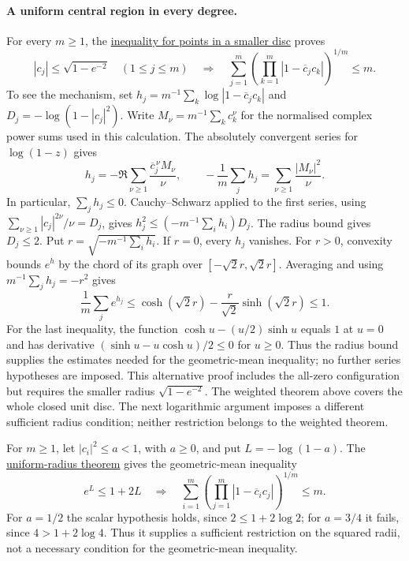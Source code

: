 \documentclass[11pt]{article}
\begin{document}
\paragraph{A uniform central region in every degree.}
For every $m\ge1$, the
\href{https://github.com/wcook04/plectis-erdos/blob/3be82b1a7340284aea72e9a5c8493cb020843921/ErdosProblems/Erdos1041/FreePointCentralCompletion.lean#L39}{inequality for points in a smaller disc}
proves
\[
 |c_j|\le\sqrt{1-e^{-2}}\quad(1\le j\le m)
 \quad\Longrightarrow\quad
 \sum_{j=1}^m\left(\prod_{k=1}^m|1-\overline c_jc_k|\right)^{1/m}\le m.
\]
To see the mechanism, set
$h_j=m^{-1}\sum_k\log|1-\overline c_jc_k|$ and
$D_j=-\log(1-|c_j|^2)$. Write
$M_\nu=m^{-1}\sum_k c_k^\nu$ for the normalised complex power sums used in this
calculation. The absolutely convergent series for $\log(1-z)$ gives
\[
 h_j=-\Re\sum_{\nu\ge1}\frac{\overline c_j^{\,\nu}M_\nu}{\nu},
 \qquad
 -\frac1m\sum_jh_j=\sum_{\nu\ge1}\frac{|M_\nu|^2}{\nu}.
\]
In particular, $\sum_jh_j\le0$. Cauchy--Schwarz applied to the first
series, using
$\sum_{\nu\ge1}|c_j|^{2\nu}/\nu=D_j$, gives
$h_j^2\le(-m^{-1}\sum_i h_i)D_j$. The radius bound gives $D_j\le2$.
Put $r=\sqrt{-m^{-1}\sum_i h_i}$. If $r=0$, every $h_j$ vanishes.
For $r>0$, convexity bounds $e^h$ by the chord of its graph over
$[-\sqrt2r,\sqrt2r]$. Averaging and using $m^{-1}\sum_jh_j=-r^2$ gives
\[
 \frac1m\sum_j e^{h_j}
 \le\cosh(\sqrt2r)-\frac r{\sqrt2}\sinh(\sqrt2r)\le1.
\]
For the last inequality, the function $\cosh u-(u/2)\sinh u$ equals
$1$ at $u=0$ and has derivative $(\sinh u-u\cosh u)/2\le0$ for
$u\ge0$. Thus the radius bound supplies the estimates needed for the
geometric-mean inequality; no further series hypotheses are imposed.
This alternative proof includes the all-zero configuration but requires
the smaller radius $\sqrt{1-e^{-2}}$. The weighted theorem above covers
the whole closed unit disc. The next logarithmic argument imposes a
different sufficient radius condition; neither restriction belongs to
the weighted theorem.

For $m\ge1$, let $|c_i|^2\le a<1$, with $a\ge0$, and put
$L=-\log(1-a)$. The
\href{https://github.com/wcook04/plectis-erdos/blob/457e0c74b2666f7fb2d825c967e49e439a600b23/ErdosProblems/Erdos1041/FreePointUniformRadius.lean#L84}{uniform-radius theorem}
gives the geometric-mean inequality
\[
 e^L\le1+2L\quad\Longrightarrow\quad
 \sum_{i=1}^m\left(\prod_{j=1}^m|1-\overline c_i c_j|\right)^{1/m}\le m.
\]
For $a=1/2$ the scalar hypothesis holds, since
$2\le1+2\log2$; for $a=3/4$ it fails, since $4>1+2\log4$.
Thus it supplies a sufficient restriction on the squared radii, not a
necessary condition for the geometric-mean inequality.
\end{document}
